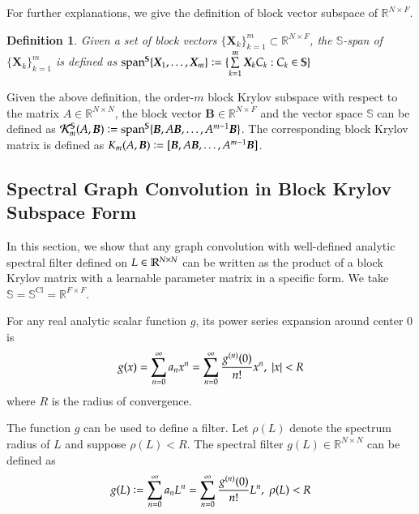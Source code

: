 \documentclass{article}
\newtheorem{definition}{Definition}
\begin{document}
For further explanations, we give the definition of block vector subspace of $\mathbb{R}^{N\times F}$.
\begin{definition}
Given a set of block vectors $\{\bm{X}_k \}_{k=1}^m \subset \mathbb{R}^{N\times F} $, the $\mathbb{S}$-span of $\{\bm{X}_k \}_{k=1}^m$ is defined as $\mathrm{span}^{\mathbb{S}} \{\bm{X}_1, \dots, \bm{X}_m\} \vcentcolon = \{ \sum\limits_{k=1}^{m} \bm{X}_k C_k: C_k \in  \mathbb{S} \}$
\end{definition}
Given the above definition, the order-$m$ block Krylov subspace with respect to the matrix $A\in \mathbb{R}^{N\times N}$, the block vector $\bm{B}\in \mathbb{R}^{N\times F}$ and the vector space $\mathbb{S}$ can be defined as $\mathcal{K}_m^{\mathbb{S}} (A,\bm{B}) \vcentcolon = \text{span}^{\mathbb{S}} \{\bm{B}, A\bm{B}, \dots, A^{m-1} \bm{B}\} $. The corresponding block Krylov matrix is defined as $K_m (A,\bm{B})\vcentcolon = [ \bm{B}, A\bm{B}, \dots, A^{m-1} \bm{B}]$.


\subsection{Spectral Graph Convolution in Block Krylov Subspace Form}
\label{conv_in_krylov}
In this section, we show that any graph convolution with well-defined analytic spectral filter defined on $\boldmath{L} \in \mathbb{R}^{N\times N}$ can be written as the product of a block Krylov matrix with a learnable parameter matrix in a specific form. We take $\mathbb{S}=\mathbb{S}^{\text{Cl}} = \mathbb{R}^{F\times F}$.

For any real analytic scalar function $g$, its power series expansion around center $0$ is
$$g(x) = \sum\limits_{n=0}^\infty a_n x^n = \sum\limits_{n=0}^\infty \frac{g^{(n) } (0)}{n!} x^n, \; \abs{x} < R$$
where $R$ is the radius of convergence.

The function $g$ can be used to define a filter. Let $\rho(L)$ denote the spectrum radius of $L$ and suppose $\rho(L) < R$. The spectral filter $g(L)\in \mathbb{R}^{N \times N}$ can be defined as
$$g(L) \vcentcolon = \sum\limits_{n=0}^\infty a_n L^n =\sum\limits_{n=0}^\infty \frac{g^{(n) } (0)}{n!} L^n, \; \rho(L) < R$$
\end{document}
